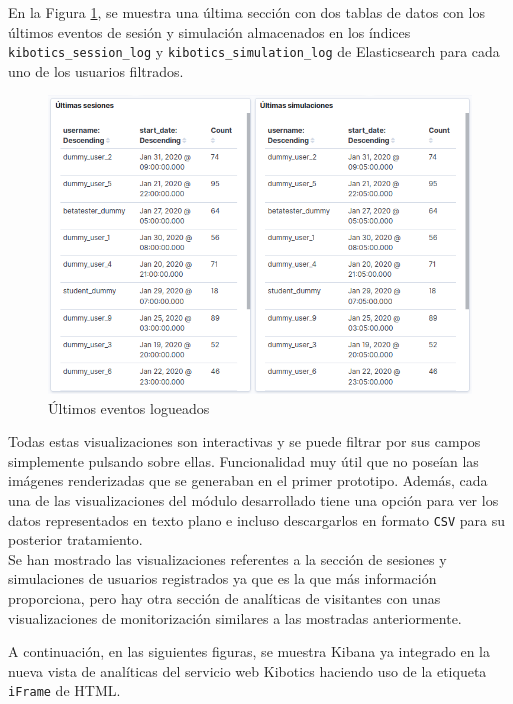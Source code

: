 \documentclass[a4paper, 12pt]{book}
\begin{document}
		En la Figura \ref{fig:kibana_latestevent}, se muestra una última sección con dos tablas de datos con los últimos eventos de sesión y simulación almacenados en los índices \texttt{kibotics\_session\_log} y \texttt{kibotics\_simulation\_log} de Elasticsearch para cada uno de los usuarios filtrados. 
		\begin{figure}[H]
			\centering
			\includegraphics[width=12cm, keepaspectratio]{img/kibana_08_latest_event}
			\caption{Últimos eventos logueados}
			\label{fig:kibana_latestevent}
		\end{figure}
		
		Todas estas visualizaciones son interactivas y se puede filtrar por sus campos simplemente pulsando sobre ellas. Funcionalidad muy útil que no poseían las imágenes renderizadas que se generaban en el primer prototipo. Además, cada una de las visualizaciones del módulo desarrollado tiene una opción para ver los datos representados en texto plano e incluso descargarlos en formato \texttt{CSV} para su posterior tratamiento.\\
		
		Se han mostrado las visualizaciones referentes a la sección de sesiones y simulaciones de usuarios registrados ya que es la que más información proporciona, pero hay otra sección de analíticas de visitantes con unas visualizaciones de monitorización similares a las mostradas anteriormente.
		
	 	A continuación, en las siguientes figuras, se muestra Kibana ya integrado en la nueva vista de analíticas del servicio web Kibotics haciendo uso de la etiqueta  \texttt{iFrame} de HTML.
				
\end{document}
